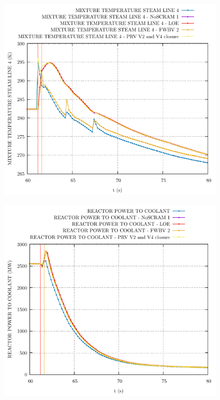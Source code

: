 \documentclass{article}
\begin{document}
\begin{multicols}{2}
\begin{figure}[H]
\centering
\includegraphics[width=\linewidth]{./graphs/MIXTURE TEMPERATURE STEAM LINE 4.pdf}
\end{figure}
\begin{figure}[H]
\centering
\includegraphics[width=\linewidth]{./graphs/REACTOR POWER TO COOLANT.pdf}
\end{figure}

\end{multicols}
\end{document}
